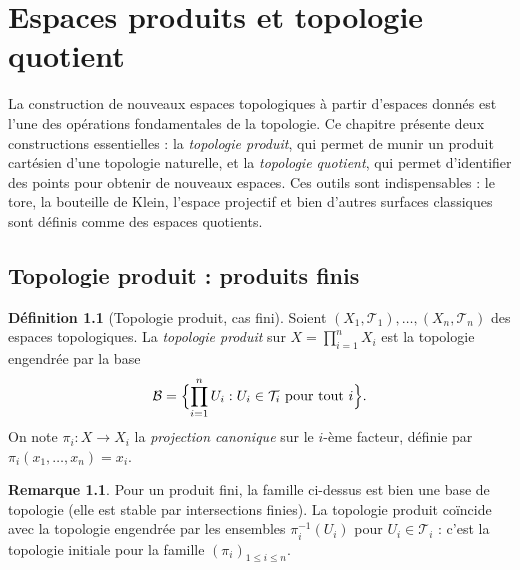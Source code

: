 \documentclass[12pt,a4paper,openany]{book}
\theoremstyle{definition}
\newtheorem{definition}{Définition}[chapter]
\theoremstyle{cours}
\theoremstyle{coursnormal}
\newtheorem{remarque}[theoreme]{Remarque}
\begin{document}

\chapter{Espaces produits et topologie quotient}
\label{chap:produit-quotient}

\medskip
\noindent
La construction de nouveaux espaces topologiques à partir d'espaces donnés est
l'une des opérations fondamentales de la topologie. Ce chapitre présente deux
constructions essentielles : la \emph{topologie produit}, qui permet de munir un
produit cartésien d'une topologie naturelle, et la \emph{topologie quotient}, qui
permet d'identifier des points pour obtenir de nouveaux espaces. Ces outils sont
indispensables : le tore, la bouteille de Klein, l'espace projectif et bien
d'autres surfaces classiques sont définis comme des espaces quotients.

\section{Topologie produit : produits finis}
\label{sec:topologie-produit-fini}

\begin{definition}[Topologie produit, cas fini]
\label{def:topologie-produit-finie}
Soient $(X_1, \mathcal{T}_1), \ldots, (X_n, \mathcal{T}_n)$ des espaces topologiques.
La \emph{topologie produit} sur $X = \prod_{i=1}^n X_i$ est la topologie engendrée
par la base
\[
\mathcal{B} = \Bigl\{ \prod_{i=1}^n U_i : U_i \in \mathcal{T}_i \text{ pour tout } i \Bigr\}.
\]
On note $\pi_i \colon X \to X_i$ la \emph{projection canonique}
sur le $i$-ème facteur, définie par $\pi_i(x_1, \ldots, x_n) = x_i$.
\end{definition}

\begin{remarque}
\label{rem:produit-fini-base}
Pour un produit fini, la famille ci-dessus est bien une base de topologie (elle est
stable par intersections finies). La topologie produit coïncide avec la topologie
engendrée par les ensembles $\pi_i^{-1}(U_i)$ pour $U_i \in \mathcal{T}_i$ :
c'est la topologie initiale pour la famille $(\pi_i)_{1 \leqslant i \leqslant n}$.
\end{remarque}
\end{document}
